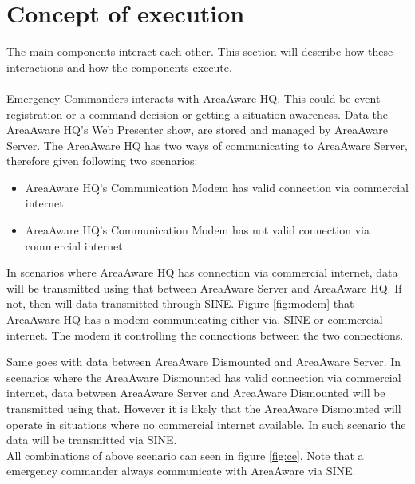 \section{Concept of execution}
\label{sec:concept_execution}

The main components interact each other. This section will describe how these interactions and how the components execute.\\\\
\noindent Emergency Commanders interacts with AreaAware HQ.
This could be event registration or a command decision or getting a situation awareness.
Data the AreaAware HQ's Web Presenter show, are stored and managed by AreaAware Server.
The AreaAware HQ has two ways of communicating to AreaAware Server, therefore given following two scenarios:
\begin{itemize}
\item AreaAware HQ's Communication Modem has valid connection via commercial internet.
\item AreaAware HQ's Communication Modem has not valid connection via commercial internet.
\end{itemize}
In scenarios where AreaAware HQ has connection via commercial internet, data will be transmitted using that between AreaAware Server and AreaAware HQ.
If not, then will data transmitted through SINE.
Figure \ref{fig:modem} that AreaAware HQ has a modem communicating either via. SINE or commercial internet. The modem it controlling the connections between the two connections.


\noindent Same goes with data between AreaAware Dismounted and AreaAware Server.
In scenarios where the AreaAware Dismounted has valid connection via commercial internet, data between AreaAware Server and AreaAware Dismounted will be transmitted using that.
However it is likely that the AreaAware Dismounted will operate in situations where no commercial internet available.
In such scenario the data will be transmitted via SINE.\\

\noindent All combinations of above scenario can seen in figure \ref{fig:ce}.
Note that a emergency commander always communicate with AreaAware via SINE.

